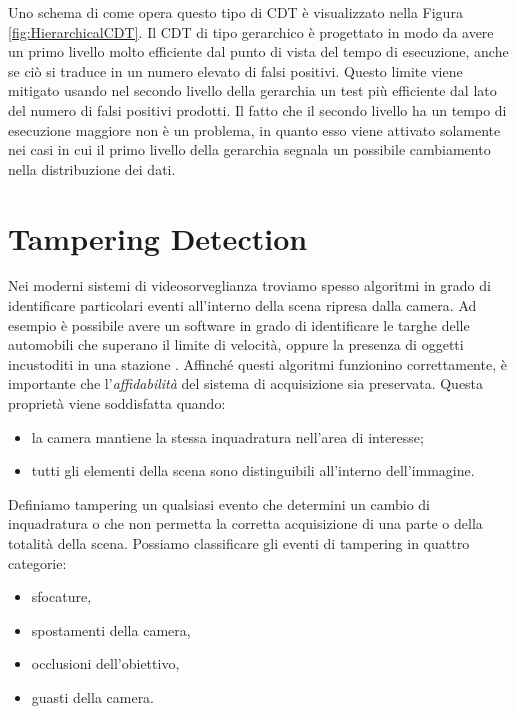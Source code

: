 Uno schema di come opera questo tipo di CDT \`e visualizzato nella Figura \ref{fig:HierarchicalCDT}.
Il CDT di tipo gerarchico \`e progettato in modo da avere un primo livello molto efficiente dal punto di vista del tempo di esecuzione, anche se ci\`o si traduce in un numero elevato di falsi positivi. Questo limite viene mitigato usando nel secondo livello della gerarchia un test pi\`u efficiente dal lato del numero di falsi positivi prodotti. Il fatto che il secondo livello ha un tempo di esecuzione maggiore non \`e un problema, in quanto esso viene attivato solamente nei casi in cui il primo livello della gerarchia segnala un possibile cambiamento nella distribuzione dei dati.
\section{Tampering Detection}
\label{tamperingSOA}
Nei moderni sistemi di videosorveglianza troviamo spesso algoritmi in grado di identificare particolari eventi all'interno della scena ripresa dalla camera. 
Ad esempio \`e possibile avere un software in grado di identificare le targhe delle automobili che superano il limite di velocit\`a, oppure la presenza di oggetti incustoditi in una stazione \cite{Targhe}.
Affinch\'e questi algoritmi funzionino correttamente, \`e importante che l'\textit{affidabilit\`a} del sistema di acquisizione sia preservata.
Questa propriet\`a viene soddisfatta quando:
\begin{itemize}
	\item la camera mantiene la stessa inquadratura nell'area di interesse;
	\item tutti gli elementi della scena sono distinguibili all'interno dell'immagine.
\end{itemize}
Definiamo \gls{tampering} un qualsiasi evento che determini un cambio di inquadratura o che non permetta la corretta acquisizione di una parte o della totalit\`a della scena.
Possiamo classificare gli eventi di tampering in quattro categorie:
\begin{itemize}
	\item sfocature,
	\item spostamenti della camera,
	\item occlusioni dell'obiettivo,
	\item guasti della camera.
\end{itemize}
